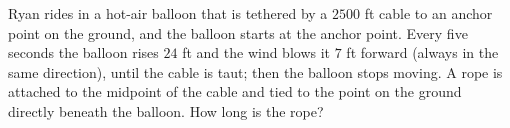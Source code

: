 Ryan rides in a hot-air balloon that is tethered by a $2500$ ft cable to an anchor point on the ground, and the balloon starts at the anchor point. Every five seconds the balloon rises $24$ ft and the wind blows it $7$ ft forward (always in the same direction), until the cable is taut; then the balloon stops moving. A rope is attached to the midpoint of the cable and tied to the point on the ground directly beneath the balloon. How long is the rope?
